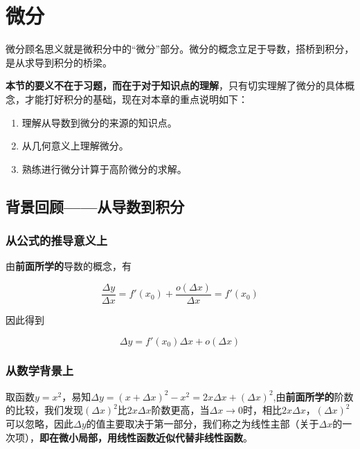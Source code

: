 \chapter{微分}\label{ch:3}

微分顾名思义就是微积分中的“微分”部分。微分的概念立足于导数，搭桥到积分，是从求导到积分的桥梁。

\textbf{本节的要义不在于习题，而在于对于知识点的理解}，只有切实理解了微分的具体概念，才能打好积分的基础，现在对本章的重点说明如下：

\begin{enumerate}
	\item 理解从导数到微分的来源的知识点。
	\item 从几何意义上理解微分。
	\item 熟练进行微分计算于高阶微分的求解。
\end{enumerate}

\section{背景回顾——从导数到积分}\label{sec:3.1}

\subsection{从公式的推导意义上}\label{sec:3.1.1}

由\textbf{前面所学的}导数的概念，有

\begin{equation}
	\frac{\Delta y}{\Delta x}=f'(x_0)+\frac{o(\Delta x)}{\Delta x}=f'(x_0)\label{eq:3.1}
\end{equation}

因此得到

\begin{equation}
	\Delta y=f'(x_0)\Delta x+o(\Delta x)\label{eq:3.2}
\end{equation}

\subsection{从数学背景上}\label{sec:3.1.2}

取函数$y=x^2$，易知$\Delta y=(x+\Delta x)^2-x^2=2x\Delta x+(\Delta x)^2$,由\textbf{前面所学的}阶数的比较，我们发现$(\Delta x)^2$比$2x\Delta x$阶数更高，当$\Delta x\rightarrow 0$时，相比$2x\Delta x$，$(\Delta x)^2$可以忽略，因此$\Delta y$的值主要取决于第一部分，我们称之为线性主部（关于$\Delta x$的一次项），\textbf{即在微小局部，用线性函数近似代替非线性函数}。

